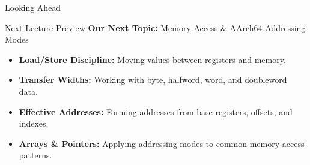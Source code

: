 \documentclass[aspectratio=169,11pt,t]{beamer}
\newcommand{\key}[1]{\textbf{#1}}
\begin{document}







\begin{frame}{Looking Ahead}
\vfill
\begin{block}{Next Lecture Preview}
\key{Our Next Topic:} Memory Access \& AArch64 Addressing Modes
\end{block}

\vfill
\begin{itemize}\setlength{\itemsep}{7pt}
  \item \key{Load/Store Discipline:} Moving values between registers and memory.
  \item \key{Transfer Widths:} Working with byte, halfword, word, and doubleword data.
  \item \key{Effective Addresses:} Forming addresses from base registers, offsets, and indexes.
  \item \key{Arrays \& Pointers:} Applying addressing modes to common memory-access patterns.
\end{itemize}
\vfill
\end{frame}
\end{document}
